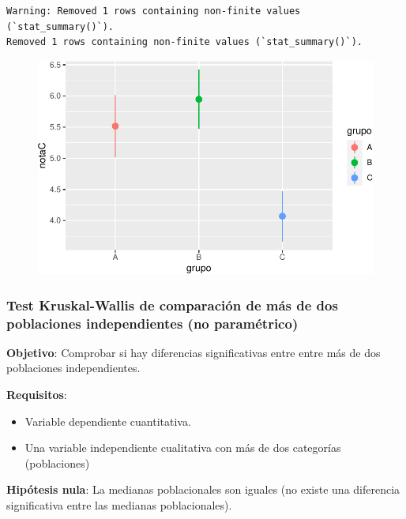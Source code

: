 \documentclass[
  a4paper,
]{scrreport}
\providecommand{\tightlist}{%
  \setlength{\itemsep}{0pt}\setlength{\parskip}{0pt}}\usepackage{longtable,booktabs,array}
\theoremstyle{definition}
\theoremstyle{definition}
\theoremstyle{remark}
\begin{document}
\begin{verbatim}
Warning: Removed 1 rows containing non-finite values (`stat_summary()`).
Removed 1 rows containing non-finite values (`stat_summary()`).
\end{verbatim}

\begin{figure}[H]

{\centering \includegraphics{./08-analisis-estadisticos_files/figure-pdf/unnamed-chunk-54-1.pdf}

}

\end{figure}

\hypertarget{test-kruskal-wallis-de-comparaciuxf3n-de-muxe1s-de-dos-poblaciones-independientes-no-paramuxe9trico}{%
\subsubsection{Test Kruskal-Wallis de comparación de más de dos
poblaciones independientes (no
paramétrico)}\label{test-kruskal-wallis-de-comparaciuxf3n-de-muxe1s-de-dos-poblaciones-independientes-no-paramuxe9trico}}

\textbf{Objetivo}: Comprobar si hay diferencias significativas entre
entre más de dos poblaciones independientes.

\textbf{Requisitos}:

\begin{itemize}
\tightlist
\item
  Variable dependiente cuantitativa.
\item
  Una variable independiente cualitativa con más de dos categorías
  (poblaciones)
\end{itemize}

\textbf{Hipótesis nula}: La medianas poblacionales son iguales (no
existe una diferencia significativa entre las medianas poblacionales).
\end{document}
